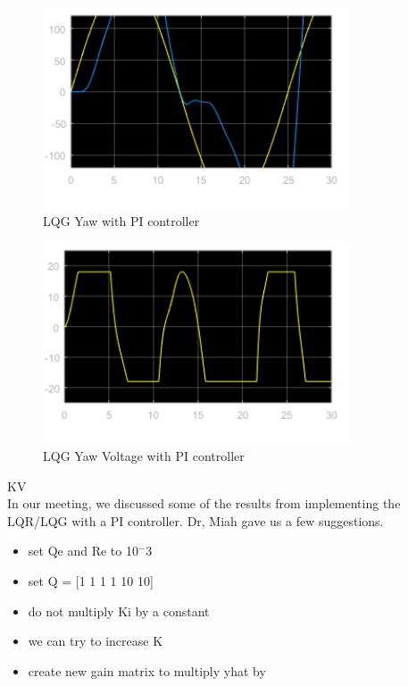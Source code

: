 \documentclass[fontsize=11pt, %
                             paper=letter, %
                             openany, %
                             captions=tableheading,
                             index=totoc,
                             hyperref]{labbook}
\begin{document}
\begin{addmargin}[0cm]{0cm}
\begin{figure}
  \centering
  \includegraphics[width=0.8\textwidth]{figs/img/02152019/LQG_Yaw02152019.png}
  \caption{LQG Yaw with PI controller}
  \label{fig:LQG_PI_Pitch}
\end{figure}

\begin{figure}
  \centering
  \includegraphics[width=0.8\textwidth]{figs/img/02152019/LQG_YawVolt02152019.png}
  \caption{LQG Yaw Voltage with PI controller}
  \label{fig:LQG_PI_YawVolt}
\end{figure}

KV\\
In our meeting, we discussed some of the results from implementing the LQR/LQG with a PI controller.  Dr, Miah gave us a few suggestions.

\begin{itemize}
    \item set Qe and Re to 10$^-3$
    \item set Q = [1 1 1 1 10 10]
    \item do not multiply Ki by a constant
    \item we can try to increase K
    \item create new gain matrix to multiply yhat by
\end{itemize}


\end{addmargin}
\end{document}
